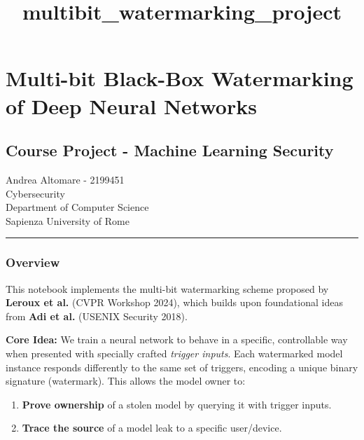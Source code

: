 \documentclass[11pt]{article}
\title{multibit\_watermarking\_project}
\providecommand{\tightlist}{%
      \setlength{\itemsep}{0pt}\setlength{\parskip}{0pt}}
\begin{document}
    
    \maketitle
    
    

    
    \section{Multi-bit Black-Box Watermarking of Deep Neural
Networks}\label{multi-bit-black-box-watermarking-of-deep-neural-networks}

\subsection{Course Project - Machine Learning
Security}\label{course-project---machine-learning-security}

Andrea Altomare - 2199451\\
Cybersecurity\\
Department of Computer Science\\
Sapienza University of Rome

\begin{center}\rule{0.5\linewidth}{0.5pt}\end{center}

\subsubsection{Overview}\label{overview}

This notebook implements the multi-bit watermarking scheme proposed by
\textbf{Leroux et al.} (CVPR Workshop 2024), which builds upon
foundational ideas from \textbf{Adi et al.} (USENIX Security 2018).

\textbf{Core Idea:} We train a neural network to behave in a specific,
controllable way when presented with specially crafted \emph{trigger
inputs}. Each watermarked model instance responds differently to the
same set of triggers, encoding a unique binary signature (watermark).
This allows the model owner to:

\begin{enumerate}
\def\labelenumi{\arabic{enumi}.}
\tightlist
\item
  \textbf{Prove ownership} of a stolen model by querying it with trigger
  inputs.
\item
  \textbf{Trace the source} of a model leak to a specific user/device.
\end{enumerate}
\end{document}
